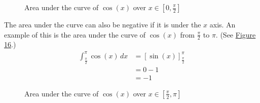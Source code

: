 \documentclass[12pt]{article}
\begin{document}
\begin{figure}[H]
	\begin{center}
		\caption{Area under the curve of $\cos(x)$ over $x \in [0, \frac{\pi}{2}]$}
		\label{fig:auccosx1}
	\end{center}
\end{figure}

The area under the curve can also be negative if it is under the $x$ axis. An example of this is the area under the curve of $\cos(x)$ from $\frac{\pi}{2}$ to $\pi$. (See \hyperref[fig:auccosx2]{Figure 16}.)
\begin{align*}
	\int_{\frac{\pi}{2}}^\pi \cos(x) \, dx & = \left[ \sin(x) \right]_{\frac{\pi}{2}}^\pi \\[6pt]
	& = 0 - 1                                      \\
	& = -1
\end{align*}

\begin{figure}[H]
	\begin{center}
		\caption{Area under the curve of $\cos(x)$ over $x \in [\frac{\pi}{2}, \pi]$}
		\label{fig:auccosx2}
	\end{center}
\end{figure}
\end{document}
